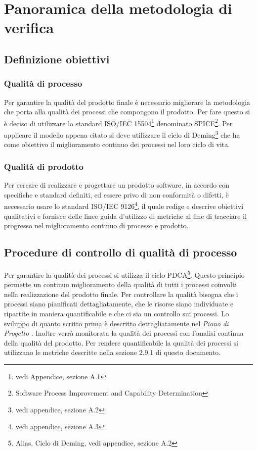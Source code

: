\newpage
\section{Panoramica della metodologia di verifica}%
\label{2.1}
\subsection{Definizione obiettivi}
\subsubsection{Qualità di processo} %
\label{2.1.1}
Per garantire la qualità del prodotto finale è necessario migliorare la metodologia che porta alla qualità dei processi che compongono il prodotto. Per fare questo si è deciso di utilizzare lo standard ISO/IEC 15504\footnote{vedi Appendice, sezione A.1} denominato SPICE\footnote{Software Process Improvement and Capability Determination}.
Per applicare il modello appena citato si deve utilizzare il ciclo di Deming\footnote{vedi appendice, sezione A.2} che ha come obiettivo il miglioramento continuo dei processi nel loro ciclo di vita.

\subsubsection{Qualità di prodotto} %
\label{2.1.2}
Per cercare di realizzare e progettare un prodotto software, in accordo con specifiche e standard definiti, ed essere privo di non conformità o difetti, è necessario usare lo standard ISO/IEC 9126\footnote{vedi appendice, sezione A.3}, il quale redige e descrive obiettivi qualitativi e fornisce delle linee guida d'utilizzo di metriche al fine di tracciare il progresso nel miglioramento continuo di processo e prodotto.

\subsection{Procedure di controllo di qualità di processo} %
\label{2.2}
Per garantire la qualità dei processi si utilizza il ciclo PDCA\footnote{Alias, Ciclo di Deming, vedi appendice, sezione A.2}.  Questo principio permette un continuo miglioramento della qualità di tutti i processi coinvolti nella realizzazione del prodotto finale.
Per controllare la qualità bisogna che i processi siano pianificati dettagliatamente, che le risorse siano individuate e ripartite in maniera quantificabile e che ci sia un controllo sui processi. Lo sviluppo di quanto scritto prima è descritto dettagliatamente nel \emph{Piano di Progetto \versionePianoDiProgetto{}}.
Inoltre verrà monitorata la qualità dei processi con l'analisi continua della qualità del prodotto.
Per rendere quantificabile la qualità dei processi si utilizzano le metriche descritte nella sezione 2.9.1 di questo documento.
